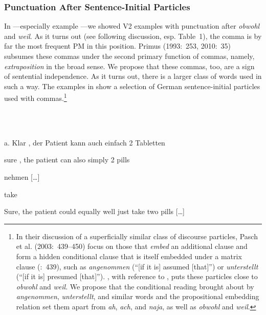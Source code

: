 \subsubsection{Punctuation After Sentence-Initial Particles}



In —especially example —we showed V2 examples with punctuation after \textit{obwohl} and \textit{weil}. As it turns out (see following discussion, esp. Table~1), the comma is by far the most frequent PM in this position. Primus (1993:~253, 2010:~35) subsumes these commas under the second primary function of commas, namely, \textit{extraposition} in the broad sense. We propose that these commas, too, are a sign of sentential independence. As it turns out, there is a larger class of words used in such a way. The examples in  show a selection of German sentence-initial particles used with commas.\footnote{In their discussion of a superficially similar class of discourse particles, Pasch et al. (2003:~439–450) focus on those that \textit{embed} an additional clause and form a hidden conditional clause that is itself embedded under a matrix clause (\citealt{PaschEtAl2003}:~439), such as \textit{angenommen} (“[if it is] assumed [that]”) or \textit{unterstellt} (“[if it is] presumed [that]”). \citet[327]{Freywald2016}, with reference to \citet{PaschEtAl2003}, puts these particles close to \textit{obwohl} and \textit{weil}. We propose that the conditional reading brought about by \textit{angenommen}, \textit{unterstellt}, and similar words and the propositional embedding relation set them apart from \textit{ah}, \textit{ach}, and \textit{naja}, as well as \textit{obwohl} and \textit{weil}.}



\ea%
    \label{ex:key:9}
    \gll\\
        \\
    \glt
    \z

          a.  Klar  ,  der  Patient  kann  auch  einfach  2  Tabletten



sure  ,  the  patient  can  also  simply  2  pills



nehmen […]



take



Sure, the patient could equally well just take two pills […]




